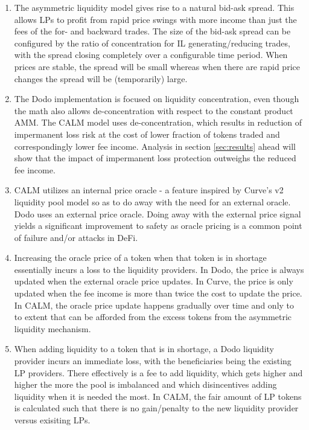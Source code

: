 \documentclass [10pt, twoside] {article}
\begin{document}
\begin{enumerate}
\item The asymmetric liquidity model gives rise to a natural bid-ask spread. This allows LPs to profit from rapid price swings with more income than just the fees of the for- and backward trades. The size of the bid-ask spread can be configured by the ratio of concentration for IL generating/reducing trades, with the spread closing completely over a configurable time period. When prices are stable, the spread will be small whereas when there are rapid price changes the spread will be (temporarily) large.
\item The Dodo implementation is focused on liquidity concentration, even though the math also allows de-concentration with respect to the constant product AMM. The CALM model uses de-concentration, which results in reduction of impermanent loss risk at the cost of lower fraction of tokens traded and correspondingly lower fee income. Analysis in section \ref{sec:results} ahead will show that the impact of impermanent loss protection outweighs the reduced fee income.
\item CALM utilizes an internal price oracle - a feature inspired by Curve's v2 liquidity pool model so as to do away with the need for an external oracle. Dodo uses an external price oracle. Doing away with the external price signal yields a significant improvement to safety as oracle pricing is a common point of failure and/or attacks in DeFi.
\item Increasing the oracle price of a token when that token is in shortage essentially incurs a loss to the liquidity providers. In Dodo, the price is always updated when the external oracle price updates. In Curve, the price is only updated when the fee income is more than twice the cost to update the price. In CALM, the oracle price update happens gradually over time and only to to extent that can be afforded from the excess tokens from the asymmetric liquidity mechanism.
\item When adding liquidity to a token that is in shortage, a Dodo liquidity provider incurs an immediate loss, with the beneficiaries being the existing LP providers. There effectively is a fee to add liquidity, which gets higher and higher the more the pool is imbalanced and which disincentives adding liquidity when it is needed the most. In CALM, the fair amount of LP tokens is calculated such that there is no gain/penalty to the new liquidity provider versus exisiting LPs.
\end{enumerate}
\end{document}
